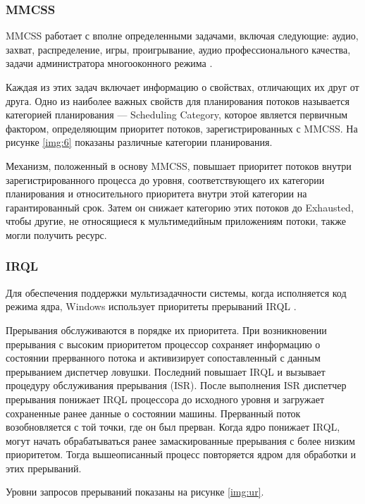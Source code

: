 \subsubsection*{MMCSS}

MMCSS работает с вполне определенными задачами, включая следующие: аудио, захват, распределение, игры, проигрывание, аудио профессионального качества, задачи администратора многооконного режима \cite{win9}.

Каждая из этих задач включает информацию о свойствах, отличающих их друг от друга. Одно из наиболее важных свойств для планирования потоков называется категорией планирования --- Scheduling Category, которое является первичным фактором, определяющим приоритет потоков, зарегистрированных с MMCSS. На рисунке \ref{img:6} показаны различные категории планирования.


\newpage

Механизм, положенный в основу MMCSS, повышает приоритет потоков
внутри зарегистрированного процесса до уровня, соответствующего их категории
планирования и относительного приоритета внутри этой категории на гарантированный срок. Затем он снижает категорию этих потоков до Exhausted, чтобы другие, не относящиеся к мультимедийным приложениям потоки, также могли получить ресурс.

\subsubsection*{IRQL}

Для обеспечения поддержки мультизадачности системы, когда исполняется код режима ядра, Windows использует приоритеты прерываний IRQL \cite{win10}. 

Прерывания обслуживаются в порядке их приоритета. При возникновении прерывания с высоким приоритетом процессор сохраняет информацию о состоянии прерванного потока и активизирует сопоставленный с данным прерыванием диспетчер ловушки. Последний повышает IRQL и вызывает
процедуру обслуживания прерывания (ISR). После выполнения ISR диспетчер прерывания понижает IRQL процессора до исходного уровня и загружает сохраненные ранее данные о состоянии машины. Прерванный поток возобновляется с той точки, где он был прерван. Когда ядро понижает IRQL, могут начать обрабатываться ранее замаскированные прерывания с более низким приоритетом. Тогда вышеописанный процесс повторяется ядром для обработки и этих прерываний.

Уровни запросов прерываний показаны на рисунке \ref{img:ur}.



